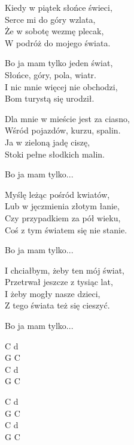\begin{textn}
    Kiedy w piątek słońce świeci,\\
    Serce mi do góry wzlata,\\
    Że w sobotę wezmę plecak,\\
    W podróż do mojego świata.

    \vin Bo ja mam tylko jeden świat,\\
    \vin Słońce, góry, pola, wiatr.\\
    \vin I nic mnie więcej nie obchodzi,\\
    \vin Bom turystą się urodził.

    Dla mnie w mieście jest za ciasno,\\
    Wśród pojazdów, kurzu, spalin.\\
    Ja w zieloną jadę ciszę,\\
    Stoki pełne słodkich malin.

    \vin Bo ja mam tylko...

    Myślę leżąc pośród kwiatów,\\
    Lub w jęczmienia złotym łanie,\\
    Czy przypadkiem za pół wieku,\\
    Coś z tym światem się nie stanie.

    \vin Bo ja mam tylko...

    I chciałbym, żeby ten mój świat,\\
    Przetrwał jeszcze z tysiąc lat,\\
    I żeby mogły nasze dzieci,\\
    Z tego świata też się cieszyć.

    \vin Bo ja mam tylko...
\end{textn}
\begin{chordw}
    C d\\
    G C\\
    C d\\
    G C

    C d\\
    G C\\
    C d\\
    G C
\end{chordw}